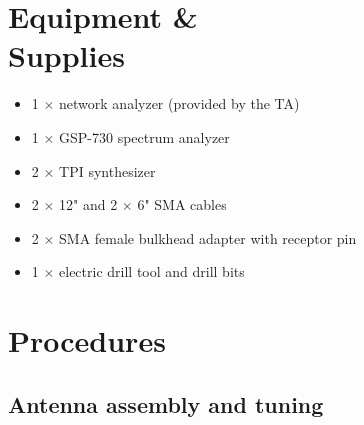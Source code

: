 \documentclass[letterpaper, 11pt]{article}
\begin{document}
\section{Equipment \& \\Supplies}

\begin{itemize}[itemsep=0.5ex]
	\item 1 $\times$ network analyzer (provided by the TA)
	\item 1 $\times$ GSP-730 spectrum analyzer
	\item 2 $\times$ TPI synthesizer
	\item 2 $\times$ 12" and 2 $\times$ 6" SMA cables
	\item 2 $\times$ SMA female bulkhead adapter with receptor pin
	\item 1 $\times$ electric drill tool and drill bits
\end{itemize}


\section{Procedures}

\subsection{Antenna assembly and tuning}
\label{sec:antenna_assbly}
\end{document}
